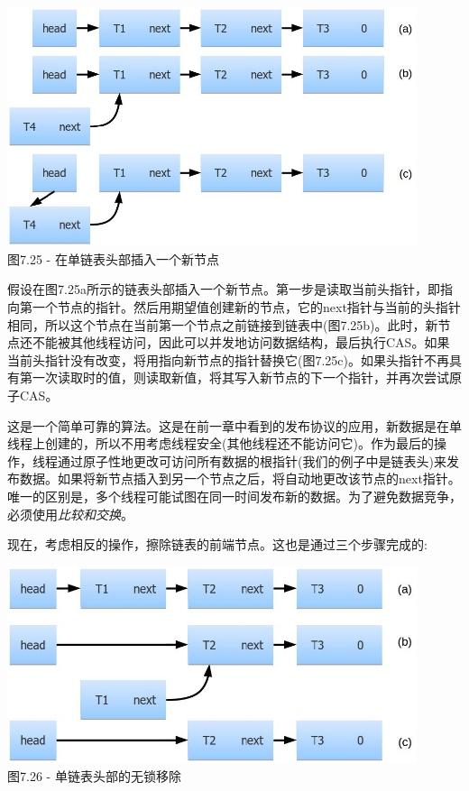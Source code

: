 \begin{center}
\includegraphics[width=0.9\textwidth]{content/2/chapter7/images/25.jpg}\\
图7.25 - 在单链表头部插入一个新节点
\end{center}

假设在图7.25a所示的链表头部插入一个新节点。第一步是读取当前头指针，即指向第一个节点的指针。然后用期望值创建新的节点，它的next指针与当前的头指针相同，所以这个节点在当前第一个节点之前链接到链表中(图7.25b)。此时，新节点还不能被其他线程访问，因此可以并发地访问数据结构，最后执行CAS。如果当前头指针没有改变，将用指向新节点的指针替换它(图7.25c)。如果头指针不再具有第一次读取时的值，则读取新值，将其写入新节点的下一个指针，并再次尝试原子CAS。

这是一个简单可靠的算法。这是在前一章中看到的发布协议的应用，新数据是在单线程上创建的，所以不用考虑线程安全(其他线程还不能访问它)。作为最后的操作，线程通过原子性地更改可访问所有数据的根指针(我们的例子中是链表头)来发布数据。如果将新节点插入到另一个节点之后，将自动地更改该节点的next指针。唯一的区别是，多个线程可能试图在同一时间发布新的数据。为了避免数据竞争，必须使用\textit{比较和交换}。 

现在，考虑相反的操作，擦除链表的前端节点。这也是通过三个步骤完成的:

\begin{center}
\includegraphics[width=0.9\textwidth]{content/2/chapter7/images/26.jpg}\\
图7.26 - 单链表头部的无锁移除
\end{center}

